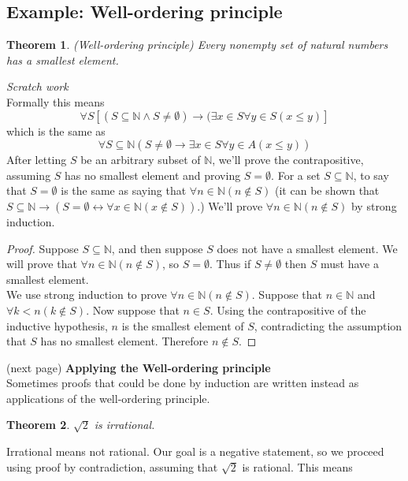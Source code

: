 \documentclass{report}
\newtheorem*{theorem}{Theorem}
\theoremstyle{definition}
\begin{document}
\subsection{Example: Well-ordering principle}
\begin{theorem}
(Well-ordering principle) Every nonempty set of natural numbers has a smallest element. 
\end{theorem}
\noindent\textit{Scratch work}\\
Formally this means
\begin{equation*}
\forall S[(S\subseteq\mathbb N\land S\neq\emptyset)\to(\exists x\in S\forall y\in S(x\leq y)]
\end{equation*}
which is the same as
\begin{equation*}
\forall S\subseteq\mathbb N(S\neq\emptyset\to\exists x\in S\forall y\in A(x\leq y))
\end{equation*}
After letting $S$ be an arbitrary subset of $\mathbb N$, we'll prove the contrapositive, assuming $S$ has no smallest element and proving $S=\emptyset$. For a set $S\subseteq\mathbb N$, to say that 
$S=\emptyset$ is the same as saying that $\forall n\in\mathbb N(n\notin S)$ (it can be shown 
that $S\subseteq\mathbb N\to(S=\emptyset\leftrightarrow\forall x\in\mathbb N(x\notin S))$.) We'll prove 
$\forall n\in\mathbb N(n\notin S)$ by strong induction.
\begin{proof}
Suppose $S\subseteq\mathbb N$, and then suppose $S$ does not have a smallest element. We will prove that 
$\forall n\in\mathbb N(n\notin S)$, so $S=\emptyset$. Thus if $S\neq\emptyset$ then $S$ must have a smallest element.\\
\indent We use strong induction to prove $\forall n\in\mathbb N(n\notin S)$. Suppose that $n\in\mathbb N$ and $\forall k<n(k\notin S)$. Now suppose that $n\in S$. Using the contrapositive of the 
inductive hypothesis, $n$ is the smallest element of $S$, contradicting the assumption that $S$ has no smallest element. Therefore $n\notin S$.
\end{proof}
\noindent(next page)\newpage
\noindent\textbf{Applying the Well-ordering principle}\\
Sometimes proofs that could be done by induction are written instead as applications of the well-ordering principle.
\begin{theorem}
$\sqrt2$ is irrational.
\end{theorem}
\noindent Irrational means not rational. Our goal is a negative statement, so we proceed using proof by contradiction, assuming that $\sqrt2$ is rational. This means
\end{document}
